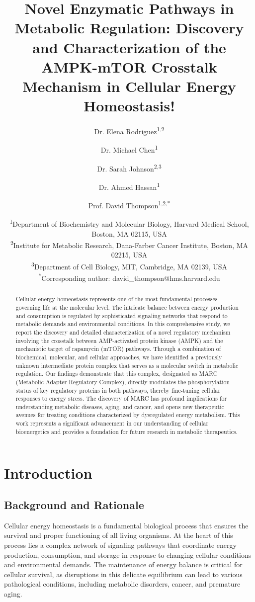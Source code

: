 \documentclass[11pt,a4paper]{article}
\title{Novel Enzymatic Pathways in Metabolic Regulation: Discovery and Characterization of the AMPK-mTOR Crosstalk Mechanism in Cellular Energy Homeostasis!}
\author{Dr. Elena Rodriguez\textsuperscript{1,2} \and 
        Dr. Michael Chen\textsuperscript{1} \and 
        Dr. Sarah Johnson\textsuperscript{2,3} \and 
        Dr. Ahmed Hassan\textsuperscript{1} \and 
        Prof. David Thompson\textsuperscript{1,2,*}}
\date{\textsuperscript{1}Department of Biochemistry and Molecular Biology, Harvard Medical School, Boston, MA 02115, USA\\
\textsuperscript{2}Institute for Metabolic Research, Dana-Farber Cancer Institute, Boston, MA 02215, USA\\
\textsuperscript{3}Department of Cell Biology, MIT, Cambridge, MA 02139, USA\\
\textsuperscript{*}Corresponding author: david\_thompson@hms.harvard.edu}
\begin{document}
\maketitle

\begin{abstract}
Cellular energy homeostasis represents one of the most fundamental processes governing life at the molecular level. The intricate balance between energy production and consumption is regulated by sophisticated signaling networks that respond to metabolic demands and environmental conditions. In this comprehensive study, we report the discovery and detailed characterization of a novel regulatory mechanism involving the crosstalk between AMP-activated protein kinase (AMPK) and the mechanistic target of rapamycin (mTOR) pathways. Through a combination of biochemical, molecular, and cellular approaches, we have identified a previously unknown intermediate protein complex that serves as a molecular switch in metabolic regulation. Our findings demonstrate that this complex, designated as MARC (Metabolic Adapter Regulatory Complex), directly modulates the phosphorylation status of key regulatory proteins in both pathways, thereby fine-tuning cellular responses to energy stress. The discovery of MARC has profound implications for understanding metabolic diseases, aging, and cancer, and opens new therapeutic avenues for treating conditions characterized by dysregulated energy metabolism. This work represents a significant advancement in our understanding of cellular bioenergetics and provides a foundation for future research in metabolic therapeutics.
\end{abstract}

\newpage

\tableofcontents

\newpage

\section{Introduction}

\subsection{Background and Rationale}

Cellular energy homeostasis is a fundamental biological process that ensures the survival and proper functioning of all living organisms. At the heart of this process lies a complex network of signaling pathways that coordinate energy production, consumption, and storage in response to changing cellular conditions and environmental demands. The maintenance of energy balance is critical for cellular survival, as disruptions in this delicate equilibrium can lead to various pathological conditions, including metabolic disorders, cancer, and premature aging.
\end{document}
